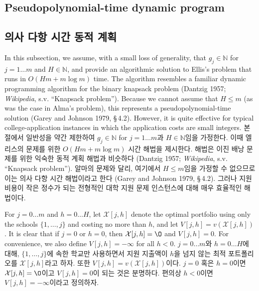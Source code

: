 \documentclass[11pt]{article} %
\theoremstyle{definition}
\theoremstyle{definition}
\begin{document}
\ifen \subsection{Pseudopolynomial-time dynamic program} \else\subsection{의사 다항 시간 동적 계획} \fi
\ifen
In this subsection, we assume, with a small loss of generality, that $g_j \in \mathbb{N}$ for $j = 1\dots m$ and $H \in\mathbb{N}$, and provide an algorithmic solution to Ellis's problem that runs in $O(Hm + m\log m)$ time. The algorithm resembles a familiar dynamic programming algorithm for the binary knapsack problem (Dantzig 1957; \emph{Wikipedia}, s.v. ``Knapsack problem''). Because we cannot assume that $H \leq m$ (as was the case in Alma's problem), this represents a pseudopolynomial-time solution (Garey and Johnson 1979, \S\,4.2). However, it is quite effective for typical college-application instances in which the application costs are small integers.
\else
본 절에서 일반성을 약간 제한하여 $g_j \in \mathbb{N}$ for $j = 1\dots m$과 $H \in\mathbb{N}$임을 가정한다. 이때 엘리스의 문제를 위한 $O(Hm + m\log m)$ 시간 해법을 제시한다. 해법은 이진 배낭 문제를 위한 익숙한 동적 계획 해법과 비슷하다 (Dantzig 1957; \emph{Wikipedia}, s.v. ``Knapsack problem''). 알마의 문제와 달리, 여기에서 $H \leq m$임을 가정할 수 없으므로 이는 의사 다항 시간 해법이라고 한다 (Garey and Johnson 1979, \S\,4.2). 그러나 지원 비용이 작은 정수가 되는 전형적인 대학 지원 문제 인스턴스에 대해 매우 효율적인 해법이다.
\fi

\ifen 
For $j = 0 \dots m$ and $h = 0 \dots H$, let $\mathcal{X}[j, h]$ denote the optimal portfolio using only the schools $\{ 1, \dots, j\}$ and costing no more than $h$, and let $V[j,h] = v(\mathcal{X}[j, h])$.  It is clear that if $j=0$ or $h=0$, then $\mathcal{X}[j, h] = \O$ and $V[j, h] = 0$.  For convenience, we also define $V[j, h] = -\infty$ for all $h < 0$.
\else
$j = 0 \dots m$와 $h = 0 \dots H$에 대해, $\{ 1, \dots, j\}$에 속한 학교만 사용하면서 지원 지출액이 $h$을 넘지 않는 최적 포트폴리오를 $\mathcal{X}[j, h]$라고 하자. 또한  $V[j,h] = v(\mathcal{X}[j, h])$이다. $j=0$ 혹은 $h=0$이면 $\mathcal{X}[j, h] = \O$이고 $V[j, h] = 0$이 되는 것은 분명하다. 편의상 $h < 0$이면 $V[j, h] = -\infty$이라고 정의하자.
\fi
\end{document}
